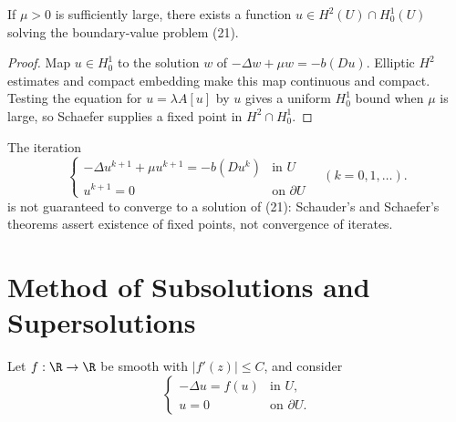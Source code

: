 \begin{theorem}
\label{thm:schaefer-quasilinear-existence}
If $\mu > 0$ is sufficiently large, there exists a function $u \in H^2(U) \cap H^1_0(U)$ solving the boundary-value problem (21).
\end{theorem}

\begin{proof}
\sketch Map $u\in H_0^1$ to the solution $w$ of $-\Delta w+\mu w=-b(Du)$. Elliptic $H^2$ estimates and compact embedding make this map continuous and compact. Testing the equation for $u=\lambda A[u]$ by $u$ gives a uniform $H_0^1$ bound when $\mu$ is large, so Schaefer supplies a fixed point in $H^2\cap H_0^1$.
\end{proof}

\begin{remark}
\label{rem:iteration-scheme-warning}
The iteration
\[
\begin{cases}
-\Delta u^{k+1} + \mu u^{k+1} = -b(Du^k) & \text{in } U \\
u^{k+1} = 0 & \text{on } \partial U
\end{cases} \quad (k = 0, 1, \ldots).
\]
is not guaranteed to converge to a solution of (21): Schauder's and Schaefer's theorems assert existence of fixed points, not convergence of iterates.
\end{remark}

\section{Method of Subsolutions and Supersolutions}
\label{sec:subsolutions-supersolutions}

Let $f:\R\to\R$ be smooth with $|f'(z)|\leq C$, and consider
\[
\begin{cases}
-\Delta u=f(u) & \text{in }U,\\
u=0 & \text{on }\partial U.
\end{cases}
\tag{1}
\]

